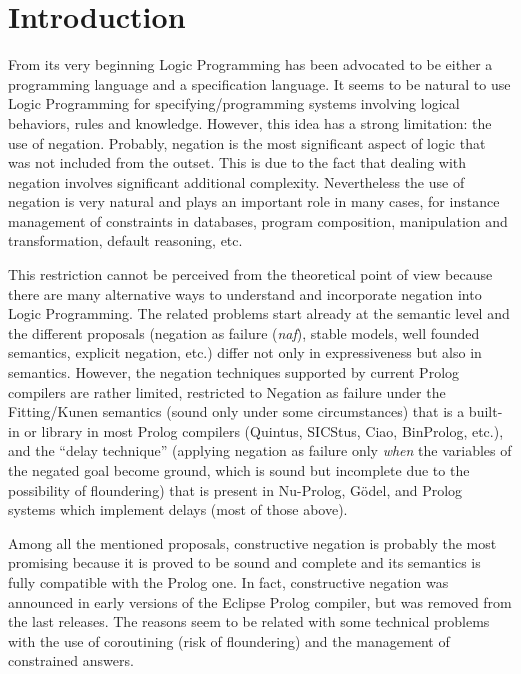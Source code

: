 \documentclass{llncs}
\newcommand{\naf}{{\em naf}}\newcommand{\viejo}[1]{}
\begin{document}

\section{Introduction}
\label{introduction}
From its very beginning Logic Programming has been advocated to be either
a programming language and a specification language. 
It seems to be natural to use Logic Programming for specifying/programming systems
involving logical behaviors, rules and knowledge. However, this idea has a strong
limitation: the use of negation.
Probably,
negation is the most significant aspect of logic that was not included
from the outset. This is due to the fact that dealing with negation
involves significant additional complexity. 
Nevertheless the use of negation is very natural and plays an important role 
in many cases, for instance management of constraints in databases, program
composition, manipulation and transformation, default reasoning,
etc.

This restriction cannot be perceived from the theoretical point of
view because there are many alternative ways to understand and
incorporate negation into Logic Programming. The related problems
start already at the semantic level and the different proposals
(negation as failure (\naf), stable models, well founded semantics,
explicit negation, etc.)  differ not only in expressiveness but also
in semantics.  However, the negation techniques supported by current
Prolog compilers are rather limited, restricted to Negation as failure
under the Fitting/Kunen semantics \cite{Kunen} (sound only under some
circumstances) that is a built-in or library in most Prolog compilers
(Quintus, SICStus, Ciao, BinProlog, etc.), and the ``delay technique''
(applying negation as failure only \emph{when} the variables of the
negated goal become ground, which is sound but incomplete due to the
possibility of floundering) that is present in Nu-Prolog, G\"odel, and
Prolog systems which implement delays (most of those above).

Among all the mentioned proposals, constructive negation is probably the most 
promising because it is proved to be sound and complete and
its semantics is fully compatible with the Prolog one. In fact, 
constructive negation was announced in early versions of the 
Eclipse Prolog compiler, but was removed from the last releases.
The reasons seem to be related with some technical problems with the use
of coroutining (risk of floundering) and the management of constrained answers.
\end{document}
